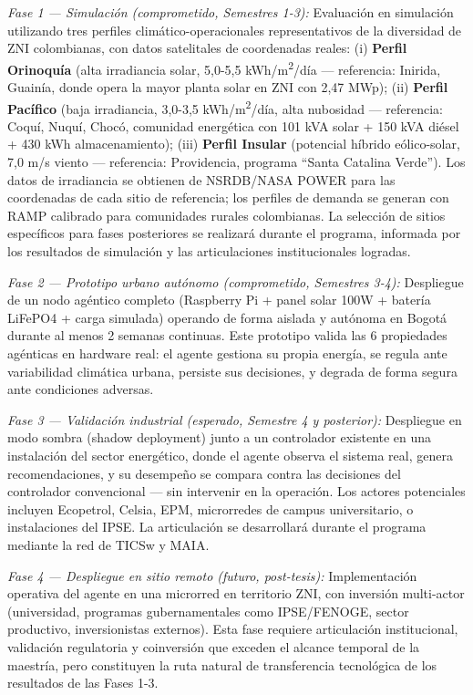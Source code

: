 \documentclass[12pt,letterpaper]{article}
\begin{document}
\textit{Fase 1 --- Simulaci\'on (comprometido, Semestres 1-3):} Evaluaci\'on en simulaci\'on utilizando tres perfiles clim\'atico-operacionales representativos de la diversidad de ZNI colombianas, con datos satelitales de coordenadas reales: (i) \textbf{Perfil Orinoqu\'ia} (alta irradiancia solar, 5,0-5,5 kWh/m\textsuperscript{2}/d\'ia --- referencia: Inirida, Guain\'ia, donde opera la mayor planta solar en ZNI con 2,47 MWp); (ii) \textbf{Perfil Pac\'ifico} (baja irradiancia, 3,0-3,5 kWh/m\textsuperscript{2}/d\'ia, alta nubosidad --- referencia: Coqu\'i, Nuqu\'i, Choc\'o, comunidad energ\'etica con 101 kVA solar + 150 kVA di\'esel + 430 kWh almacenamiento); (iii) \textbf{Perfil Insular} (potencial h\'ibrido e\'olico-solar, 7,0 m/s viento --- referencia: Providencia, programa ``Santa Catalina Verde''). Los datos de irradiancia se obtienen de NSRDB/NASA POWER para las coordenadas de cada sitio de referencia; los perfiles de demanda se generan con RAMP calibrado para comunidades rurales colombianas. La selecci\'on de sitios espec\'ificos para fases posteriores se realizar\'a durante el programa, informada por los resultados de simulaci\'on y las articulaciones institucionales logradas.

\textit{Fase 2 --- Prototipo urbano aut\'onomo (comprometido, Semestres 3-4):} Despliegue de un nodo ag\'entico completo (Raspberry Pi + panel solar 100W + bater\'ia LiFePO4 + carga simulada) operando de forma aislada y aut\'onoma en Bogot\'a durante al menos 2 semanas continuas. Este prototipo valida las 6 propiedades ag\'enticas en hardware real: el agente gestiona su propia energ\'ia, se regula ante variabilidad clim\'atica urbana, persiste sus decisiones, y degrada de forma segura ante condiciones adversas.

\textit{Fase 3 --- Validaci\'on industrial (esperado, Semestre 4 y posterior):} Despliegue en modo sombra (shadow deployment) junto a un controlador existente en una instalaci\'on del sector energ\'etico, donde el agente observa el sistema real, genera recomendaciones, y su desempe\~no se compara contra las decisiones del controlador convencional --- sin intervenir en la operaci\'on. Los actores potenciales incluyen Ecopetrol, Celsia, EPM, microrredes de campus universitario, o instalaciones del IPSE. La articulaci\'on se desarrollar\'a durante el programa mediante la red de TICSw y MAIA.

\textit{Fase 4 --- Despliegue en sitio remoto (futuro, post-tesis):} Implementaci\'on operativa del agente en una microrred en territorio ZNI, con inversi\'on multi-actor (universidad, programas gubernamentales como IPSE/FENOGE, sector productivo, inversionistas externos). Esta fase requiere articulaci\'on institucional, validaci\'on regulatoria y coinversi\'on que exceden el alcance temporal de la maestr\'ia, pero constituyen la ruta natural de transferencia tecnol\'ogica de los resultados de las Fases 1-3.
\end{document}
